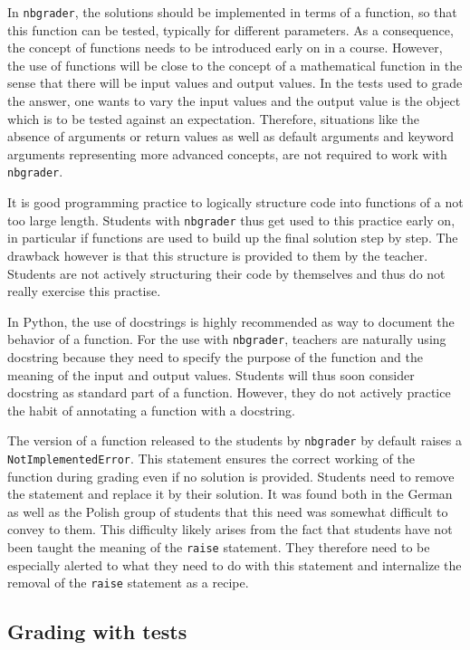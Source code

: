 \documentclass[twocolumn]{svjour3}          %
\begin{document}
In \texttt{nbgrader}, the solutions should be implemented in terms of a
function, so that this function can be tested, typically for different
parameters. As a consequence, the concept of functions needs to be introduced
early on in a course. However, the use of functions will be close to the
concept of a mathematical function in the sense that there will be input values
and output values. In the tests used to grade the answer, one wants to vary the
input values and the output value is the object which is to be tested against
an expectation. Therefore, situations like the absence of arguments or return
values as well as default arguments and keyword arguments representing more
advanced concepts, are not required to work with \texttt{nbgrader}.

It is good programming practice to logically structure code into functions of a
not too large length. Students with \texttt{nbgrader} thus get used to this
practice early on, in particular if functions are used to build up the final
solution step by step. The drawback however is that this structure is provided
to them by the teacher. Students are not actively structuring their code by
themselves and thus do not really exercise this practise.

In Python, the use of docstrings is highly recommended as way to document
the behavior of a function. For the use with \texttt{nbgrader}, teachers are
naturally using docstring because they need to specify the purpose of the
function and the meaning of the input and output values. Students will thus
soon consider docstring as standard part of a function. However, they do not
actively practice the habit of annotating a function with a docstring.

The version of a function released to the students by \texttt{nbgrader} by
default raises a \texttt{NotImplementedError}. This statement ensures the
correct working of the function during grading even if no solution is provided.
Students need to remove the statement and replace it by their solution. It was
found both in the German as well as the Polish group of students that this need
was somewhat difficult to convey to them. This difficulty likely arises from
the fact that students have not been taught the meaning of the \texttt{raise}
statement. They therefore need to be especially alerted to what they need to do
with this statement and internalize the removal of the \texttt{raise} statement
as a recipe.

\subsection{Grading with tests}
\end{document}
